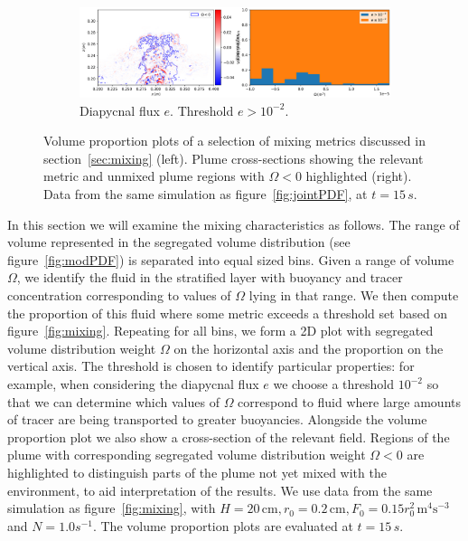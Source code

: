 \documentclass[a4paper]{article}
\begin{document}
\begin{figure}
{\begin{subfigure}[c]{0.6\textwidth}
			\centering
			\includegraphics[width=\textwidth]{e_vol}
			\caption{Diapycnal flux $e$. Threshold $e > 10^{-2}$.}
			\label{fig:e_vol}
		\end{subfigure}
	}
	\caption{Volume proportion plots of a selection of mixing metrics discussed in section~\ref{sec:mixing}
	(left). Plume cross-sections showing the relevant metric and unmixed plume regions
	with $\Omega < 0$ highlighted (right). Data from the same simulation as figure~\ref{fig:jointPDF}, at
	$t=15\,s$.}
\end{figure}

In this section we will examine the mixing characteristics as follows. The range of volume represented in the
segregated volume distribution (see figure~\ref{fig:modPDF}) is separated into equal sized bins. Given a range
of volume $\Omega$, we identify the fluid in the stratified layer with buoyancy and tracer concentration
corresponding to values of $\Omega$ lying in that range. We then compute the proportion of this fluid where
some metric exceeds a threshold set based on figure~\ref{fig:mixing}. Repeating for all bins, we form a 2D
plot with segregated volume distribution weight $\Omega$ on the horizontal axis and the proportion on the
vertical axis. The threshold is chosen to identify particular properties: for example, when considering the
diapycnal flux $e$ we choose a threshold $10^{-2}$ so that we can determine which values of $\Omega$
correspond to fluid where large amounts of tracer are being transported to greater buoyancies.  Alongside the
volume proportion plot we also show a cross-section of the relevant field. Regions of the plume with
corresponding segregated volume distribution weight $\Omega < 0$ are highlighted to distinguish parts of the
plume not yet mixed with the environment, to aid interpretation of the results. We use data from the same
simulation as figure~\ref{fig:mixing}, with $H=20\,\mathrm{cm}, r_0 = 0.2 \, \mathrm{cm}, F_0 = 0.15r_0^2 \,
\mathrm{m}^4 \mathrm{s}^{-3}$ and $N = 1.0 s^{-1}$. The volume proportion plots are evaluated at $t = 15\,s$.
\end{document}
